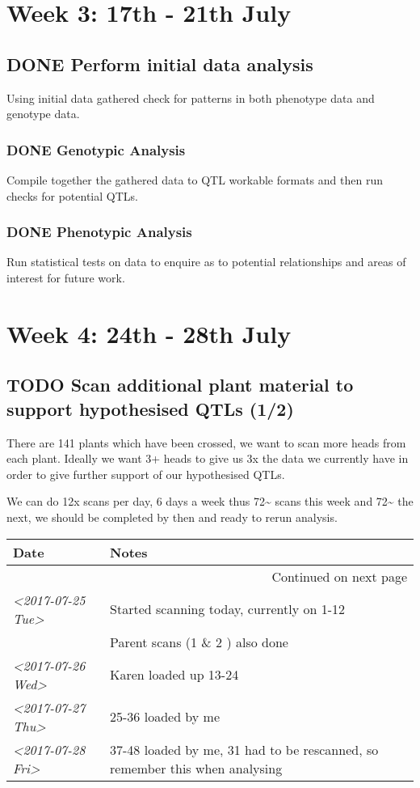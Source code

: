 \documentclass[a4paper]{article}
\begin{document}
\section{Week 3: 17th - 21th July}
\label{sec-3}
\subsection{{\bfseries\sffamily DONE} Perform initial data analysis}
\label{sec-3-1}
Using initial data gathered check for patterns in both phenotype data and genotype data. 
\subsubsection{{\bfseries\sffamily DONE} Genotypic Analysis}
\label{sec-3-1-1}
Compile together the gathered data to QTL workable formats and then run checks for potential QTLs. 
\subsubsection{{\bfseries\sffamily DONE} Phenotypic Analysis}
\label{sec-3-1-2}
Run statistical tests on data to enquire as to potential relationships and areas of interest for future work. 


\section{Week 4: 24th - 28th July}
\label{sec-4}
\subsection{{\bfseries\sffamily TODO} Scan additional plant material to support hypothesised QTLs (1/2)}
\label{sec-4-1}
There are 141 plants which have been crossed, we want to scan more heads from each plant. 
Ideally we want 3+ heads to give us 3x the data we currently have in order to give further support of our hypothesised QTLs.

We can do 12x scans per day, 6 days a week thus 72\textasciitilde{} scans this week and 72\textasciitilde{} the next, we should be completed by then and ready to rerun analysis.  

\begin{longtable}{|l|p{10cm}|}
\hline
Date & Notes\\
\hline
\endhead
\hline\multicolumn{2}{r}{Continued on next page} \\
\endfoot
\endlastfoot
\textit{<2017-07-25 Tue>} & Started scanning today, currently on 1-12\\
 & Parent scans (1 \& 2 ) also done\\
\hline
\textit{<2017-07-26 Wed>} & Karen loaded up 13-24\\
\hline
\textit{<2017-07-27 Thu>} & 25-36 loaded by me\\
\hline
\textit{<2017-07-28 Fri>} & 37-48 loaded by me, 31 had to be rescanned, so remember this when analysing\\
\hline
\end{longtable}
\end{document}

